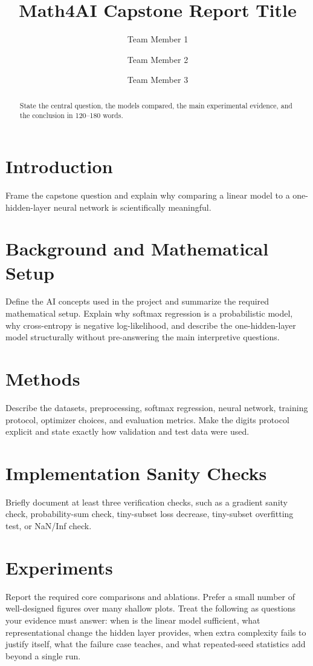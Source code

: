 \documentclass[11pt]{article}
\title{Math4AI Capstone Report Title}
\author{Team Member 1 \and Team Member 2 \and Team Member 3}
\date{}
\begin{document}
\maketitle

\begin{abstract}
State the central question, the models compared, the main experimental evidence, and the conclusion in 120--180 words.
\end{abstract}

\section{Introduction}
Frame the capstone question and explain why comparing a linear model to a one-hidden-layer neural network is scientifically meaningful.

\section{Background and Mathematical Setup}
Define the AI concepts used in the project and summarize the required mathematical setup. Explain why softmax regression is a probabilistic model, why cross-entropy is negative log-likelihood, and describe the one-hidden-layer model structurally without pre-answering the main interpretive questions.

\section{Methods}
Describe the datasets, preprocessing, softmax regression, neural network, training protocol, optimizer choices, and evaluation metrics. Make the digits protocol explicit and state exactly how validation and test data were used.

\section{Implementation Sanity Checks}
Briefly document at least three verification checks, such as a gradient sanity check, probability-sum check, tiny-subset loss decrease, tiny-subset overfitting test, or NaN/Inf check.

\section{Experiments}
Report the required core comparisons and ablations. Prefer a small number of well-designed figures over many shallow plots. Treat the following as questions your evidence must answer: when is the linear model sufficient, what representational change the hidden layer provides, when extra complexity fails to justify itself, what the failure case teaches, and what repeated-seed statistics add beyond a single run.
\end{document}
